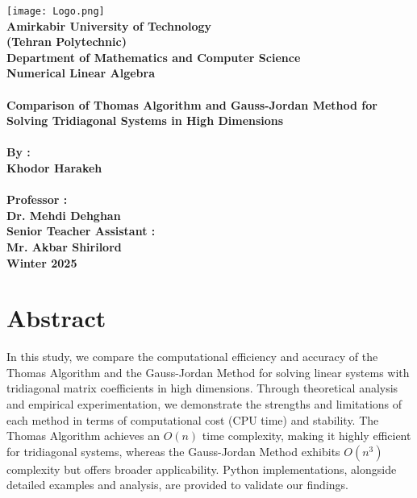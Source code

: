 \documentclass[a4paper,12pt]{article}
\begin{document}
\begin{titlepage}
    \centering
    \texttt{[image: Logo.png]} \\[1cm]
    \textbf{\large{Amirkabir University of Technology}} \\[0.5cm]
    \textbf{\large{(Tehran Polytechnic)}} \\[0.5cm]
    \textbf{\large{Department of Mathematics and Computer Science}} \\[0.5cm]
    \textbf{\large{Numerical Linear Algebra}} \\[0.5cm]
    \textbf{\Large{}} \\[0.5cm]
    \textbf{\Large{Comparison of Thomas Algorithm and Gauss-Jordan Method for Solving Tridiagonal Systems in High Dimensions}} \\[1cm]
    \textbf{\Large{}} \\[0.8cm]
    \textbf{\large{By :}} \\[0.2cm]
    \textbf{\large{Khodor Harakeh}} \\[1cm]
    \textbf{\Large{}} \\[0.2cm]
    \textbf{\large{Professor :}} \\[0.2cm]
    \textbf{\large{Dr. Mehdi Dehghan}} \\[1cm]
    \textbf{\large{Senior Teacher Assistant :}} \\[0.2cm]
    \textbf{\large{Mr. Akbar Shirilord}} \\[1cm]  
    \textbf{\large{Winter 2025}}
\end{titlepage}

\newpage
{}
\setcounter{page}{1}

\section*{Abstract}
In this study, we compare the computational efficiency and accuracy of the Thomas Algorithm and the Gauss-Jordan Method for solving linear systems with tridiagonal matrix coefficients in high dimensions. Through theoretical analysis and empirical experimentation, we demonstrate the strengths and limitations of each method in terms of computational cost (CPU time) and stability. The Thomas Algorithm achieves an \(O(n)\) time complexity, making it highly efficient for tridiagonal systems, whereas the Gauss-Jordan Method exhibits \(O(n^3)\) complexity but offers broader applicability. Python implementations, alongside detailed examples and analysis, are provided to validate our findings.
\end{document}

